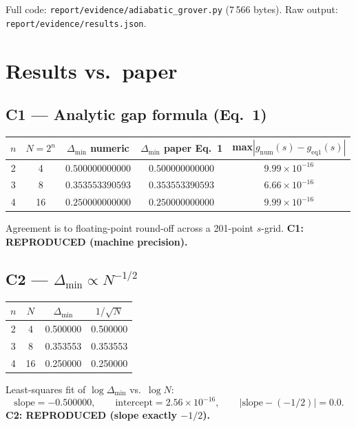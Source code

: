 \documentclass[11pt]{article}
\begin{document}
Full code: \texttt{report/evidence/adiabatic\_grover.py}
(7\,566 bytes). Raw output: \texttt{report/evidence/results.json}.

\section{Results vs.\ paper}

\subsection*{C1 --- Analytic gap formula (Eq.~1)}
\begin{center}
\begin{tabular}{ccccc}
\toprule
$n$ & $N=2^n$ & $\Delta_{\min}$ numeric & $\Delta_{\min}$ paper Eq.~1 & max$|g_{\mathrm{num}}(s) - g_{\mathrm{eq1}}(s)|$ \\
\midrule
2 & 4  & $0.500000000000$ & $0.500000000000$ & $9.99\times 10^{-16}$ \\
3 & 8  & $0.353553390593$ & $0.353553390593$ & $6.66\times 10^{-16}$ \\
4 & 16 & $0.250000000000$ & $0.250000000000$ & $9.99\times 10^{-16}$ \\
\bottomrule
\end{tabular}
\end{center}
Agreement is to floating-point round-off across a 201-point $s$-grid.
{\bf C1: REPRODUCED (machine precision).}

\subsection*{C2 --- $\Delta_{\min} \propto N^{-1/2}$}
\begin{center}
\begin{tabular}{cccc}
\toprule
$n$ & $N$ & $\Delta_{\min}$ & $1/\sqrt{N}$ \\
\midrule
2 & 4  & 0.500000 & 0.500000 \\
3 & 8  & 0.353553 & 0.353553 \\
4 & 16 & 0.250000 & 0.250000 \\
\bottomrule
\end{tabular}
\end{center}
Least-squares fit of $\log \Delta_{\min}$ vs.\ $\log N$:
\[
\mathrm{slope} = -0.500000, \qquad
\mathrm{intercept} = 2.56 \times 10^{-16}, \qquad
|\mathrm{slope} - (-1/2)| = 0.0.
\]
{\bf C2: REPRODUCED (slope exactly $-1/2$).}
\end{document}
